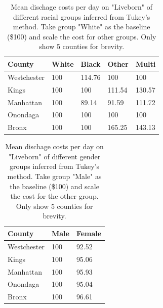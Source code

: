 \documentclass[10pt,twocolumn,letterpaper]{article}
\begin{document}
\begin{table}[]
\small
\begin{center}
\label{Tukey-race-birth}
\begin{tabular}{|l|l|l|l|l|}
\hline
\textbf{County} & \textbf{White} & \textbf{Black} & \textbf{Other} & \textbf{Multi} \\ \hline
Westchester     & 100            & 114.76         & 100            & 100            \\ \hline
Kings           & 100            & 100            & 111.54         & 130.57         \\ \hline
Manhattan       & 100            & 89.14          & 91.59          & 111.72         \\ \hline
Onondaga        & 100            & 100            & 100            & 100            \\ \hline
Bronx           & 100            & 100            & 165.25         & 143.13         \\ \hline
\end{tabular}
\end{center}
\caption{Mean dischage costs per day on "Liveborn" of different racial groups inferred from Tukey's method. Take group "White" as the baseline (\$100) and scale the cost for other groups. Only show 5 counties for brevity.}
\end{table}

\begin{table}[]
\small
\begin{center}
\label{anova-gender-birth}
\begin{tabular}{|l|l|l|}
\hline
\textbf{County} & \textbf{Male} & \textbf{Female} \\ \hline
Westchester     & 100           & 92.52           \\ \hline
Kings           & 100           & 95.06           \\ \hline
Manhattan       & 100           & 95.93           \\ \hline
Onondaga        & 100           & 95.04           \\ \hline
Bronx           & 100           & 96.61           \\ \hline
\end{tabular}
\end{center}
\caption{Mean dischage costs per day on "Liveborn" of different gender groups inferred from Tukey's method. Take group "Male" as the baseline (\$100) and scale the cost for the other group. Only show 5 counties for brevity.}
\end{table}
\end{document}

